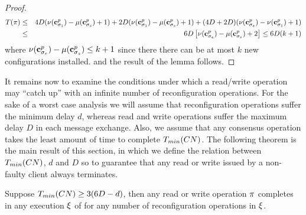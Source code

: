 {{\begin{proof}
	\begin{eqnarray*}
	T(\pi) & \leq & 4D(\nu(\mathbf{c}^{p}_{\sigma_1})-\mu(\mathbf{c}^{p}_{\sigma_s})+1) + 2D(\nu(\mathbf{c}^{p}_{\sigma_1})-\mu(\mathbf{c}^{p}_{\sigma_s})+1) + (4D+2D)(\nu(\mathbf{c}^{p}_{\sigma_e})-\nu(\mathbf{c}^{p}_{\sigma_1})+1) \\
	 & \leq & 6D\left[\nu(\mathbf{c}^{p}_{\sigma_e}) - \mu(\mathbf{c}^{p}_{\sigma_s})+2\right] \leq 6D(k+1)
	\end{eqnarray*}
where  $\nu(\mathbf{c}^{p}_{\sigma_e}) - \mu(\mathbf{c}^{p}_{\sigma_s})\leq k + 1$ since there there can be at most $k$ new configurations installed. and the result of the lemma follows.
\end{proof}
}

It remains now to examine the conditions under which a read/write operation may “catch up” with an infinite number of reconfiguration operations.
For the sake of a worst case analysis we will assume that reconfiguration operations suffer 
the minimum delay $d$, whereas read and write operations suffer the maximum
delay $D$ in each message exchange. Also, we assume that any consensus operation takes the least amount of time to complete $T_{min}(CN)$.
The following theorem is the main result of this section, in which we define the relation between $T_{min}(CN)$, $d$ and $D$
so to guarantee that any read or write issued by a non-faulty client always terminates.

\begin{theorem}
 Suppose  $T_{min}(CN) \geq 3(6D-d)$, then  any  read or write operation $\pi$ completes in any execution  $\EX$ of 
\ares{}  for any number of reconfiguration operations in $\EX$.
\end{theorem}

}
